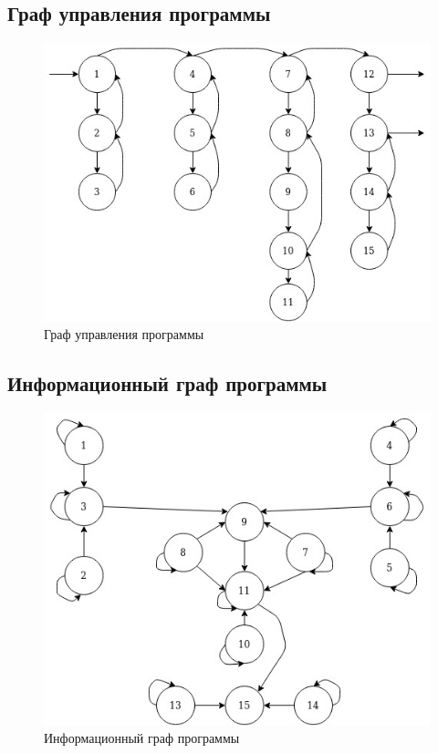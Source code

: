 \documentclass[a4paper, 12pt]{article}
\begin{document}
\subsection{Граф управления программы}
\begin{figure}[h!]
	\centering
	\includegraphics[scale=0.5]{control_graph}
	\caption{Граф управления программы}
\end{figure}

\subsection{Информационный граф программы}
\begin{figure}[h!]
	\centering
	\includegraphics[scale=0.5]{info_graph}
	\caption{Информационный граф программы}
\end{figure}
\end{document}
